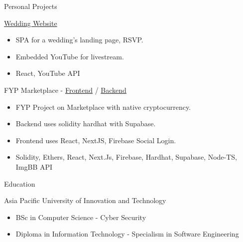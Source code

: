 \documentclass{article}
\newlength{\tabin}
\newlength{\secsep}
\newcommand{\lineunder}{\vspace*{-8pt} \\ \hspace*{-6pt} \hrulefill \\ \vspace*{-15pt}}
\newenvironment{tabbedsection}[1]{
  \begin{list}{}{
      \setlength{\itemsep}{0pt}
      \setlength{\labelsep}{0pt}
      \setlength{\labelwidth}{0pt}
      \setlength{\leftmargin}{\tabin}
      \setlength{\rightmargin}{\tabin}
      \setlength{\listparindent}{0pt}
      \setlength{\parsep}{0pt}
      \setlength{\parskip}{0pt}
      \setlength{\partopsep}{0pt}
      \setlength{\topsep}{#1}
    }
  \item[]
}{\end{list}}
\newenvironment{resume_section}[1]{
  \filbreak
  \vspace{2\secsep}
  \textsc{\large#1}
  \lineunder
  \begin{tabbedsection}{\secsep}
}{\end{tabbedsection}}
\newenvironment{resume_subsection}[2][]{
  \textbf{#2} \hfill {\footnotesize #1} \hspace{2em}
  \begin{tabbedsection}{0.5\secsep}
}{\end{tabbedsection}}
\newenvironment{subitems}{
  \renewcommand{\labelitemi}{-}
  \begin{itemize}
      \setlength{\labelsep}{1em}
}{\end{itemize}}
\begin{document}
\begin{resume_section}{Personal Projects}
  \vspace{\baselineskip}

\begin{resume_subsection}[(October 2021)]{\href{https://github.com/etcasual/dtindahouse}{Wedding Website}}
  \begin{subitems}
    \item SPA for a wedding's landing page, RSVP.
    \item Embedded YouTube for livestream.
    \item React, YouTube API
  \end{subitems}
\end{resume_subsection}

\vspace{\baselineskip}

\begin{resume_subsection}[(July 2022)]{FYP Marketplace - {\href{https://github.com/etcasual/fypfrontend}{Frontend}} / {\href{https://github.com/etcasual/fypbackend}{Backend}}}
  \begin{subitems}
    \item FYP Project on Marketplace with native cryptocurrency.
    \item Backend uses solidity hardhat with Supabase.
    \item Frontend uses React, NextJS, Firebase Social Login.
    \item Solidity, Ethers, React, Next.Js, Firebase, Hardhat, Supabase, Node-TS, ImgBB API
  \end{subitems}
\end{resume_subsection}
\end{resume_section}

\begin{resume_section}{Education}
  \begin{resume_subsection}{Asia Pacific University of Innovation and Technology}
    \begin{subitems}
      \item BSc in Computer Science - Cyber Security
      \item Diploma in Information Technology - Specialism in Software Engineering
    \end{subitems}
  \end{resume_subsection}

\end{resume_section}
\end{document}
